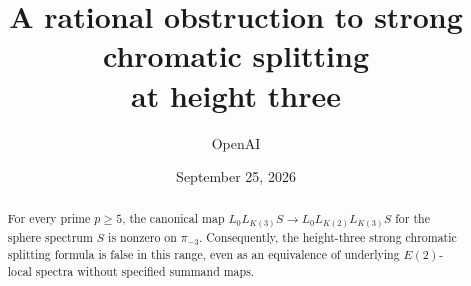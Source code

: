 \documentclass[11pt]{article}
\title{A rational obstruction to strong chromatic splitting\\at height three}
\author{OpenAI}
\date{September 25, 2026}
\begin{document}
\maketitle
\begin{abstract}
For every prime \(p\ge5\), the canonical map
\(L_0L_{K(3)}S\to L_0L_{K(2)}L_{K(3)}S\) for the sphere spectrum \(S\)
is nonzero on \(\pi_{-3}\). Consequently, the height-three strong chromatic
splitting formula is false in this range, even as an equivalence of
underlying \(E(2)\)-local spectra without specified summand maps.
\end{abstract}
\tableofcontents











\begingroup
\small
\raggedright


\endgroup
\end{document}
